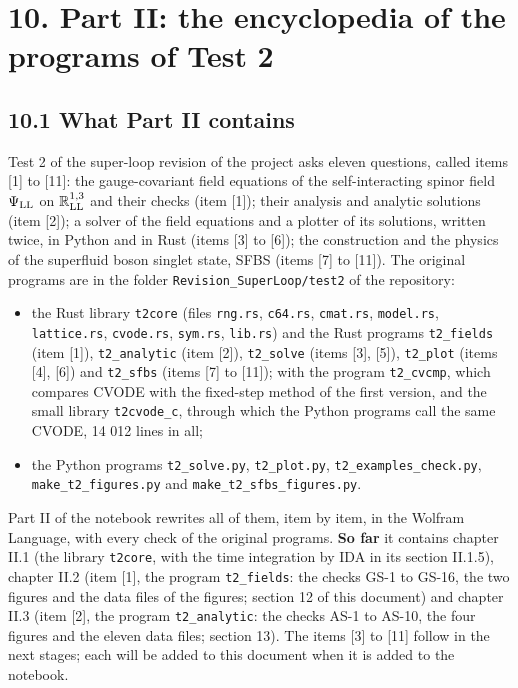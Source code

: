 \documentclass[
  10pt,
]{article}
\providecommand{\tightlist}{%
  \setlength{\itemsep}{0pt}\setlength{\parskip}{0pt}}
\begin{document}
\hypertarget{part-ii-the-encyclopedia-of-the-programs-of-test-2}{%
\section{10. Part II: the encyclopedia of the programs of Test
2}\label{part-ii-the-encyclopedia-of-the-programs-of-test-2}}

\hypertarget{what-part-ii-contains}{%
\subsection{10.1 What Part II contains}\label{what-part-ii-contains}}

Test 2 of the super-loop revision of the project asks eleven questions,
called items {[}1{]} to {[}11{]}: the gauge-covariant field equations of
the self-interacting spinor field \(\Psi_{\rm LL}\) on
\(\mathbb R^{1,3}_{\rm LL}\) and their checks (item {[}1{]}); their
analysis and analytic solutions (item {[}2{]}); a solver of the field
equations and a plotter of its solutions, written twice, in Python and
in Rust (items {[}3{]} to {[}6{]}); the construction and the physics of
the superfluid boson singlet state, SFBS (items {[}7{]} to {[}11{]}).
The original programs are in the folder
\texttt{Revision\_SuperLoop/test2} of the repository:

\begin{itemize}
\tightlist
\item
  the Rust library \texttt{t2core} (files \texttt{rng.rs},
  \texttt{c64.rs}, \texttt{cmat.rs}, \texttt{model.rs},
  \texttt{lattice.rs}, \texttt{cvode.rs}, \texttt{sym.rs},
  \texttt{lib.rs}) and the Rust programs \texttt{t2\_fields} (item
  {[}1{]}), \texttt{t2\_analytic} (item {[}2{]}), \texttt{t2\_solve}
  (items {[}3{]}, {[}5{]}), \texttt{t2\_plot} (items {[}4{]}, {[}6{]})
  and \texttt{t2\_sfbs} (items {[}7{]} to {[}11{]}); with the program
  \texttt{t2\_cvcmp}, which compares CVODE with the fixed-step method of
  the first version, and the small library \texttt{t2cvode\_c}, through
  which the Python programs call the same CVODE, 14 012 lines in all;
\item
  the Python programs \texttt{t2\_solve.py}, \texttt{t2\_plot.py},
  \texttt{t2\_examples\_check.py}, \texttt{make\_t2\_figures.py} and
  \texttt{make\_t2\_sfbs\_figures.py}.
\end{itemize}

Part II of the notebook rewrites all of them, item by item, in the
Wolfram Language, with every check of the original programs. \textbf{So
far} it contains chapter II.1 (the library \texttt{t2core}, with the
time integration by IDA in its section II.1.5), chapter II.2 (item
{[}1{]}, the program \texttt{t2\_fields}: the checks GS-1 to GS-16, the
two figures and the data files of the figures; section 12 of this
document) and chapter II.3 (item {[}2{]}, the program
\texttt{t2\_analytic}: the checks AS-1 to AS-10, the four figures and
the eleven data files; section 13). The items {[}3{]} to {[}11{]} follow
in the next stages; each will be added to this document when it is added
to the notebook.
\end{document}
